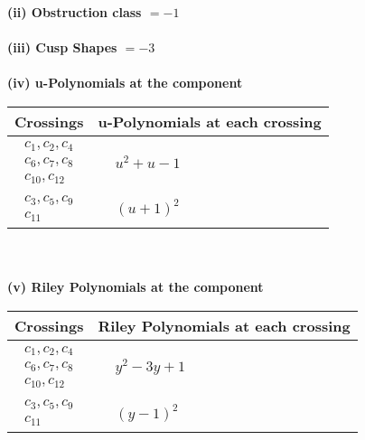 \documentclass[1p]{elsarticle_modified}
\theoremstyle{definition}
\begin{document}
\flushleft \textbf{(ii) Obstruction class $= -1$}\\~\\
\flushleft \textbf{(iii) Cusp Shapes $= -3$}\\~\\
\newpage\renewcommand{\arraystretch}{1}
\flushleft \textbf{(iv) u-Polynomials at the component}\newline \\
\begin{tabular}{m{50pt}|m{274pt}}
Crossings & \hspace{64pt}u-Polynomials at each crossing \\
\hline $$\begin{aligned}c_{1},c_{2},c_{4}\\c_{6},c_{7},c_{8}\\c_{10},c_{12}\end{aligned}$$&$\begin{aligned}
&u^2+u-1
\end{aligned}$\\
\hline $$\begin{aligned}c_{3},c_{5},c_{9}\\c_{11}\end{aligned}$$&$\begin{aligned}
&(u+1)^2
\end{aligned}$\\
\hline
\end{tabular}\\~\\
\newpage\renewcommand{\arraystretch}{1}
\flushleft \textbf{(v) Riley Polynomials at the component}\newline \\
\begin{tabular}{m{50pt}|m{274pt}}
Crossings & \hspace{64pt}Riley Polynomials at each crossing \\
\hline $$\begin{aligned}c_{1},c_{2},c_{4}\\c_{6},c_{7},c_{8}\\c_{10},c_{12}\end{aligned}$$&$\begin{aligned}
&y^2-3 y+1
\end{aligned}$\\
\hline $$\begin{aligned}c_{3},c_{5},c_{9}\\c_{11}\end{aligned}$$&$\begin{aligned}
&(y-1)^2
\end{aligned}$\\
\hline
\end{tabular}\\~\\
\end{document}
